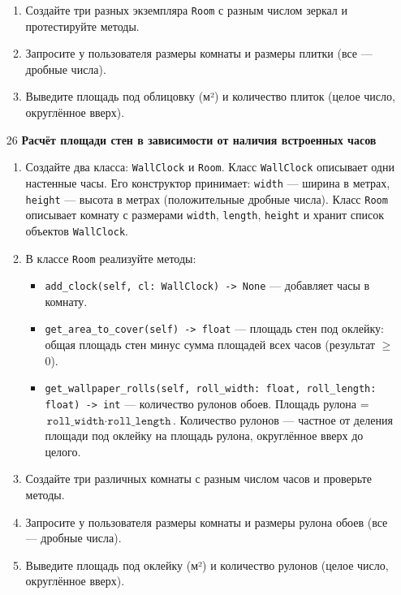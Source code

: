 \begin{enumerate}
\begin{enumerate}
    \item Создайте три разных экземпляра \texttt{Room} с разным числом зеркал и протестируйте методы.

    \item Запросите у пользователя размеры комнаты и размеры плитки (все — дробные числа).

    \item Выведите площадь под облицовку (м²) и количество плиток (целое число, округлённое вверх).
\end{enumerate}

\item[26] \textbf{Расчёт площади стен в зависимости от наличия встроенных часов}
\begin{enumerate}
    \item Создайте два класса: \texttt{WallClock} и \texttt{Room}.  
    Класс \texttt{WallClock} описывает одни настенные часы. Его конструктор принимает:  
    \texttt{width} — ширина в метрах,  
    \texttt{height} — высота в метрах (положительные дробные числа).  
    Класс \texttt{Room} описывает комнату с размерами \texttt{width}, \texttt{length}, \texttt{height} и хранит список объектов \texttt{WallClock}.

    \item В классе \texttt{Room} реализуйте методы:  
    \begin{itemize}
        \item \texttt{add\_clock(self, cl: WallClock) -> None} — добавляет часы в комнату.
        \item \texttt{get\_area\_to\_cover(self) -> float} — площадь стен под оклейку: общая площадь стен минус сумма площадей всех часов (результат $\geqslant$ 0).
        \item \texttt{get\_wallpaper\_rolls(self, roll\_width: float, roll\_length: float) -> int} — количество рулонов обоев. Площадь рулона = \(\texttt{roll\_width} \cdot \texttt{roll\_length}\). Количество рулонов — частное от деления площади под оклейку на площадь рулона, округлённое вверх до целого.
    \end{itemize}

    \item Создайте три различных комнаты с разным числом часов и проверьте методы.

    \item Запросите у пользователя размеры комнаты и размеры рулона обоев (все — дробные числа).

    \item Выведите площадь под оклейку (м²) и количество рулонов (целое число, округлённое вверх).
\end{enumerate}


\end{enumerate}

